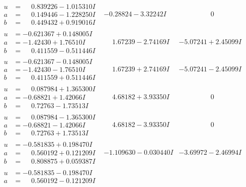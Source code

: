 \documentclass[1p]{elsarticle_modified}
\theoremstyle{definition}
\begin{document}
$$\begin{array}{c|c|c}
 \hline 
\begin{aligned}
u &= \phantom{-}0.839226 - 1.015310 I \\
a &= \phantom{-}0.149446 - 1.228250 I \\
b &= \phantom{-}0.449432 + 0.919016 I\end{aligned}
 & -0.28824 - 3.32242 I & \phantom{-0.000000 } 0 \\ \hline\begin{aligned}
u &= -0.621367 + 0.148005 I \\
a &= -1.42430 + 1.76510 I \\
b &= \phantom{-}0.411559 - 0.511446 I\end{aligned}
 & \phantom{-}1.67239 - 2.74169 I & -5.07241 + 2.45099 I \\ \hline\begin{aligned}
u &= -0.621367 - 0.148005 I \\
a &= -1.42430 - 1.76510 I \\
b &= \phantom{-}0.411559 + 0.511446 I\end{aligned}
 & \phantom{-}1.67239 + 2.74169 I & -5.07241 - 2.45099 I \\ \hline\begin{aligned}
u &= \phantom{-}0.087984 + 1.365300 I \\
a &= -0.68821 + 1.42066 I \\
b &= \phantom{-}0.72763 - 1.73513 I\end{aligned}
 & \phantom{-}4.68182 + 3.93350 I & \phantom{-0.000000 } 0 \\ \hline\begin{aligned}
u &= \phantom{-}0.087984 - 1.365300 I \\
a &= -0.68821 - 1.42066 I \\
b &= \phantom{-}0.72763 + 1.73513 I\end{aligned}
 & \phantom{-}4.68182 - 3.93350 I & \phantom{-0.000000 } 0 \\ \hline\begin{aligned}
u &= -0.581835 + 0.198470 I \\
a &= \phantom{-}0.560192 + 0.121209 I \\
b &= \phantom{-}0.808875 + 0.059387 I\end{aligned}
 & -1.109630 - 0.030440 I & -3.69972 - 2.46994 I \\ \hline\begin{aligned}
u &= -0.581835 - 0.198470 I \\
a &= \phantom{-}0.560192 - 0.121209 I \\

\end{aligned}
\end{array}$$
\end{document}
